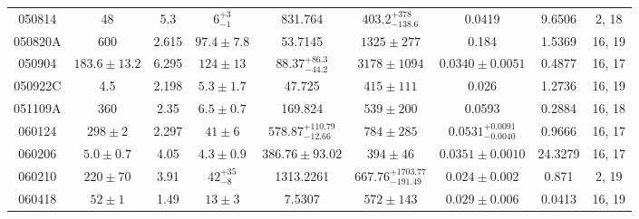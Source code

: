 \documentclass[a4paper,fleqn,usenatbib]{mnras}
\begin{document}
\begin{table*}
\begin{tabular}[width=1.0 \linewidth]{ccccccccc}
\\																																																																					050814 &	48 &	5.3 &	$6_{-1}^{+3}$ &	831.764 &	$403.2_{-138.6}^{+378}$ &	0.0419 &	9.6506 &	2, 18 \\																																																																					050820A &	600 &	2.615 &	$97.4 \pm 7.8$ &	53.7145 &	$1325\pm277$ &	0.184 &	1.5369 &	16, 19 \\																																																																					050904 &	$183.6\pm13.2$ &	6.295  &	$124 \pm 13$ &	$88.37_{-44.2}^{+86.3}$ &	$3178 \pm 1094$ &	$0.0340\pm0.0051$ &	0.4877 &	16, 17 \\																																																																					050922C &	4.5 &	2.198 &	$5.3\pm1.7$ &	47.725 &	$415\pm111$ &	0.026 &	1.2736 &	16, 19 \\																																																																					051109A &	360 &	2.35 &	$6.5 \pm 0.7$ &	   169.824 &	$539\pm200$ &	0.0593 &	0.2884 &	16, 18 \\																																																																					060124 &	$298 \pm2$ &	2.297  &	$41 \pm 6$ &	 $578.87_{-12.66}^{+110.79}$ &	$784\pm285$ &	$0.0531_{-0.0040}^{+0.0091}$ &	0.9666 &	16, 17 \\																																																																					060206 &	$5.0\pm0.7$ &	4.05 &	$4.3 \pm 0.9$ &	$386.76 \pm 93.02$ &	$394 \pm 46$ &	$0.0351\pm 0.0010$ &	24.3279 &	16, 17 \\																																																																					060210 &	$220 \pm 70$ &	3.91 &	$42_{-8}^{+35}$ &	1313.2261 &	$667.76_{-191.49}^{+1703.77}$ &	$0.024 \pm 0.002$ &	0.871 &	2, 19 \\																																																																					060418 &	$52 \pm 1$ &	1.49 &	$13 \pm 3$ &	7.5307 &	$572 \pm 143$ &	$0.029 \pm 0.006$ &	0.0413 &	16, 19 \\		

\end{tabular}
\end{table*}
\end{document}
